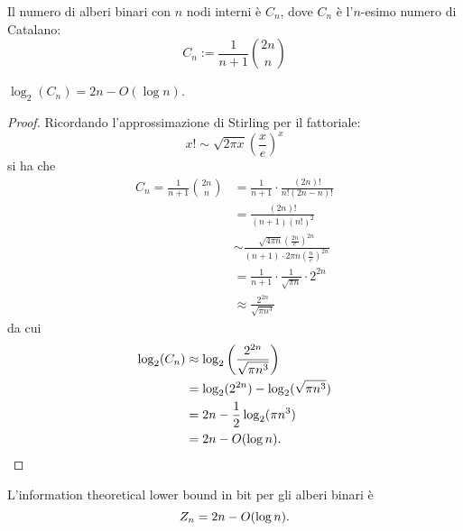\begin{theorem}\label{thm:catalano}
	Il numero di alberi binari con $n$ nodi interni è $C_n$, dove $C_n$ è l'$n$-esimo numero di Catalano:
	\begin{equation*}
		C_n := \frac{1}{n+1}\binom{2n}{n}
	\end{equation*}
\end{theorem}
\begin{corollario}
	$\log_2(C_n)=2n-O(\log n)$.
\end{corollario}
\begin{proof}
	Ricordando l'approssimazione di Stirling per il fattoriale:
	\begin{equation*}
		x! \sim \sqrt{2\pi x} \left(\frac{x}{e}\right)^x
	\end{equation*}
	si ha che
	\begin{align*}
		C_n = \frac{1}{n+1}\binom{2n}{n} & = \frac{1}{n+1}\cdot\frac{(2n)!}{n!(2n-n)!}                                                             \\
		                                 & = \frac{(2n)!}{(n+1)(n!)^2}                                                                             \\
		                                 & \sim \frac{\sqrt{4\pi n}\left(\frac{2n}{e}\right)^{2n}}{(n+1)\cdot 2\pi n\left(\frac{n}{e}\right)^{2n}} \\
		                                 & = \frac{1}{n+1}\cdot \frac{1}{\sqrt{\pi n}}\cdot 2^{2n}                                                 \\
		                                 & \approx \frac{2^{2n}}{\sqrt{\pi n^3}}
	\end{align*}
	da cui
	\begin{align*}
		\log_2(C_n) & \approx \log_2\left(\frac{2^{2n}}{\sqrt{\pi n^3}}\right) \\
		            & = \log_2(2^{2n}) - \log_2(\sqrt{\pi n^3})                \\
		            & = 2n-\frac 12 \log_2(\pi n^3)                          \\
		            & = 2n-O(\log n) \text. \qedhere
	\end{align*}
\end{proof}
\begin{corollario}\label{corol:bitree:itlb}
	L'information theoretical lower bound in bit per gli alberi binari è
	\begin{equation*}
		Z_n = 2n-O(\log n) \text.
	\end{equation*}
\end{corollario}


